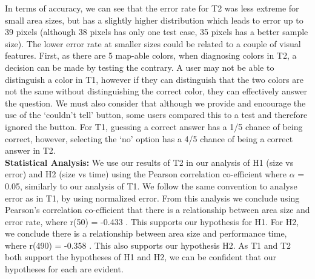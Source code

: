 In terms of accuracy, we can see that the error rate for T2 was less extreme for small area sizes, but has a slightly higher distribution which leads to error up to 39 pixels (although 38 pixels has only one test case, 35 pixels has a better  sample size). The lower error rate at smaller sizes could be related to a couple of visual features. First, as there are 5 map-able colors, when diagnosing colors in T2, a decision can be made by testing the contrary. A user may not be able to distinguish a color in T1, however if they can distinguish that the two colors are not the same without distinguishing the correct color, they can effectively answer the question. We must also consider that although we provide and encourage the use of the `couldn't tell' button, some users compared this to a test and therefore ignored the button. For T1, guessing a correct answer has a 1/5 chance of being correct, however, selecting the `no' option has a 4/5 chance of being a correct answer in T2.\\
\textbf{Statistical Analysis: } We use our results of T2 in our analysis of H1 (size vs error) and H2 (size vs time) using the Pearson correlation co-efficient where $\alpha$ = 0.05, similarly to our analysis of T1. We follow the same convention to analyse error as in T1, by using normalized error. From this analysis we conclude using Pearson's correlation co-efficient that there is a relationship between area size and error rate, where r(50) = -0.433%
. This supports our hypothesis for H1. For H2, we conclude there is a relationship between area size and performance time, where r(490) = -0.358%
. This also supports our hypothesis H2. As T1 and T2 both support the hypotheses of H1 and H2, we can be confident that our hypotheses for each are evident.
